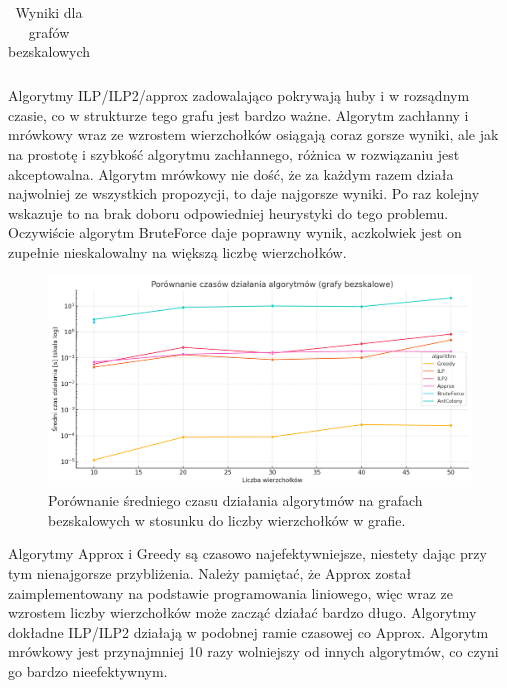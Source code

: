 \begin{table}[H]
\begin{tabular}{|c|c|c|c|c|}
    \hline
    \end{tabular}
    \caption{Wyniki dla grafów bezskalowych}
    \end{table}

    Algorytmy ILP/ILP2/approx zadowalająco pokrywają huby i w rozsądnym czasie, co w strukturze tego grafu jest bardzo ważne. Algorytm zachłanny i mrówkowy wraz ze wzrostem wierzchołków osiągają coraz gorsze wyniki, ale jak na prostotę i szybkość algorytmu zachłannego, różnica w rozwiązaniu jest akceptowalna. Algorytm mrówkowy nie dość, że za każdym razem działa najwolniej ze wszystkich propozycji, to daje najgorsze wyniki. Po raz kolejny wskazuje to na brak doboru odpowiedniej heurystyki do tego problemu. Oczywiście algorytm BruteForce daje poprawny wynik, aczkolwiek jest on zupełnie nieskalowalny na większą liczbę wierzchołków.

    \begin{figure}[H]
        \centering
        \includegraphics[width=\textwidth]{assets/scaleFree.png}
        \caption{Porównanie średniego czasu działania algorytmów na grafach bezskalowych w stosunku do liczby wierzchołków w grafie.}
        \label{fig:scaleFreePlot}
    \end{figure}

    Algorytmy Approx i Greedy są czasowo najefektywniejsze, niestety dając przy tym nienajgorsze przybliżenia. Należy pamiętać, że Approx został zaimplementowany na podstawie programowania liniowego, więc wraz ze wzrostem liczby wierzchołków może zacząć działać bardzo długo. Algorytmy dokładne ILP/ILP2 działają w podobnej ramie czasowej co Approx. Algorytm mrówkowy jest przynajmniej 10 razy wolniejszy od innych algorytmów, co czyni go bardzo nieefektywnym.

